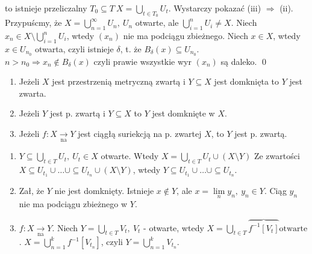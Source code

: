 \begin{dd}
\begin{itemize}
            to istnieje przeliczalny $T_0 \subseteq T \  X = \bigcup\limits_{t \in T_0} U_t$. Wystarczy pokazać (iii) $\Rightarrow$ (ii). \\ 
            Przypuścmy, że $X = \bigcup\limits_{n=1}^\infty U_n, \ U_n$ otwarte, ale $\bigcup\limits_{i=1}^n U_i \neq X$. Niech $x_n \in X \setminus \bigcup\limits_{i=1}^n U_i$,
            wtedy $(x_n)$ nie ma podciągu zbieżnego. Niech $x \in X$, wtedy $x \in U_{n_0}$ otwarta, czyli istnieje $\delta$, t. że $B_\delta(x) \subseteq U_{n_0}$. \\ 
            $n > n_0 \Rightarrow x_n \notin B_\delta(x)$ czyli prawie wszystkie wyr $(x_n)$ są daleko. 
            \hfill \qed
    \end{itemize} 
\end{dd} 

\begin{tw} \hfill 
    \begin{enumerate}[(1)]
        \item Jeżeli $X$ jest przestrzenią metryczną zwartą i $Y \subseteq X$ jest domknięta to $Y$ jest zwarta.
        \item Jeżeli $Y$ jest p. zwartą i $Y \subseteq X$ to $Y$ jest domknięte w $X$. 
        \item Jeżeli $f: X \underset{\text{na}}{\rightarrow} Y$ jest ciągłą suriekcją na p. zwartej $X$, to $Y$ jest p. zwartą.
    \end{enumerate} 
\end{tw} 
\begin{dd} \hfill  
    \begin{enumerate}[(1)] 
        \item $Y \subseteq \bigcup\limits_{t \in T} U_t,\  U_t \in X$ otwarte. Wtedy $X = \bigcup\limits_{t \in T} U_t \cup ( X \setminus Y)$
        Ze zwartości $X \subseteq U_{t_1} \cup \ldots \cup \subseteq U_{t_n} \cup (X \setminus Y)$, wtedy $Y \subseteq U_{t_1} \cup \ldots \cup \subseteq U_{t_n}$. 
        \item Zał, że $Y$ nie jest domknięty. Istnieje $x \notin Y$, ale $ x = \lim\limits_n y_n, \ y_n \in Y$. Ciąg $y_n$ nie ma podciągu zbieżnego w $Y$. \lightning
        \item $f: X \underset{\text{na}}{\rightarrow} Y$. Niech $Y = \bigcup\limits_{t \in T} V_t, \ V_t$ - otwarte, wtedy $X = \bigcup\limits_{t \in T} \overbrace{f^{-1}[V_t]}{\text{otwarte}}$.
        $X = \bigcup\limits_{n=1}^k f^{-1}[V_{t_n}]$, czyli $Y = \bigcup\limits_{n=1}^k V_{t_n}$.
    \end{enumerate}
\end{dd}
